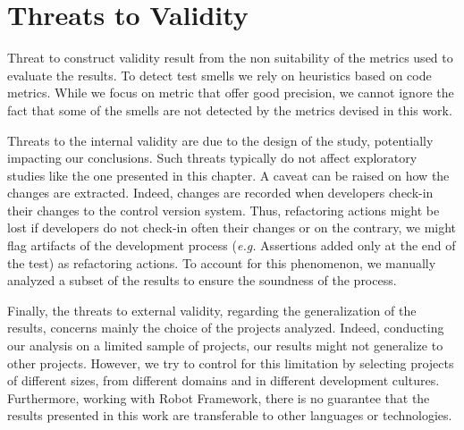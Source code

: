 \section{Threats to Validity}

Threat to construct validity result from the non suitability of the metrics used to evaluate the results. To detect test smells we rely on heuristics based on code metrics. While we focus on metric that offer good precision, we cannot ignore the fact that some of the smells are not detected by the metrics devised in this work.

Threats to the internal validity are due to the design of the study, potentially impacting our conclusions. Such threats typically do not affect exploratory studies like the one presented in this chapter. A caveat can be raised on how the changes are extracted. Indeed, changes are recorded when developers check-in their changes to the control version system. Thus, refactoring actions might be lost if developers do not check-in often their changes or on the contrary, we might flag artifacts of the development process (\emph{e.g.} Assertions added only at the end of the test) as refactoring actions. To account for this phenomenon, we manually analyzed a subset of the results to ensure the soundness of the process.

Finally, the threats to external validity, regarding the generalization of the results, concerns mainly the choice of the projects analyzed. Indeed, conducting our analysis on a limited sample of projects, our results might not generalize to other projects. However, we try to control for this limitation by selecting projects of different sizes, from different domains and in different development cultures. Furthermore, working with Robot Framework, there is no guarantee that the results presented in this work are transferable to other languages or technologies.